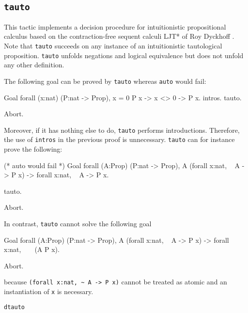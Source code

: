 \begin{coq_example*}
\subsection{\tt tauto}
\label{tauto}

This tactic implements a decision procedure for intuitionistic propositional
calculus based on the contraction-free sequent calculi LJT* of Roy Dyckhoff
\cite{Dyc92}. Note that {\tt tauto} succeeds on any instance of an
intuitionistic tautological proposition. {\tt tauto} unfolds negations
and logical equivalence but does not unfold any other definition.

The following goal can be proved by {\tt tauto} whereas {\tt auto}
would fail:

\begin{coq_example}
Goal forall (x:nat) (P:nat -> Prop), x = 0 \/ P x -> x <> 0 -> P x.
  intros.
  tauto.
\end{coq_example}
\begin{coq_eval}
Abort.
\end{coq_eval}

Moreover, if it has nothing else to do, {\tt tauto} performs
introductions. Therefore, the use of {\tt intros} in the previous
proof is unnecessary. {\tt tauto} can for instance prove the
following:
\begin{coq_example}
(* auto would fail *)
Goal forall (A:Prop) (P:nat -> Prop),
    A \/ (forall x:nat, ~ A -> P x) -> forall x:nat, ~ A -> P x.

  tauto.
\end{coq_example}
\begin{coq_eval}
Abort.
\end{coq_eval}

\Rem In contrast, {\tt tauto} cannot solve the following goal

\begin{coq_example*}
Goal forall (A:Prop) (P:nat -> Prop),
    A \/ (forall x:nat, ~ A -> P x) -> forall x:nat, ~ ~ (A \/ P x).
\end{coq_example*}
\begin{coq_eval}
Abort.
\end{coq_eval}

because \verb=(forall x:nat, ~ A -> P x)= cannot be treated as atomic and an
instantiation of \verb=x= is necessary.

\begin{Variants}

\item {\tt dtauto}


\end{Variants}
\end{coq_example*}

